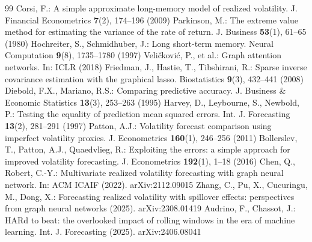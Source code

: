 \documentclass[runningheads]{llncs}
\begin{document}
\begin{thebibliography}{99}
 Corsi, F.: A simple approximate long-memory model of realized volatility. J. Financial Econometrics \textbf{7}(2), 174--196 (2009)
 Parkinson, M.: The extreme value method for estimating the variance of the rate of return. J. Business \textbf{53}(1), 61--65 (1980)
 Hochreiter, S., Schmidhuber, J.: Long short-term memory. Neural Computation \textbf{9}(8), 1735--1780 (1997)
 Veli\v{c}kovi\'c, P., et al.: Graph attention networks. In: ICLR (2018)
 Friedman, J., Hastie, T., Tibshirani, R.: Sparse inverse covariance estimation with the graphical lasso. Biostatistics \textbf{9}(3), 432--441 (2008)
 Diebold, F.X., Mariano, R.S.: Comparing predictive accuracy. J. Business \& Economic Statistics \textbf{13}(3), 253--263 (1995)
 Harvey, D., Leybourne, S., Newbold, P.: Testing the equality of prediction mean squared errors. Int. J. Forecasting \textbf{13}(2), 281--291 (1997)
 Patton, A.J.: Volatility forecast comparison using imperfect volatility proxies. J. Econometrics \textbf{160}(1), 246--256 (2011)
 Bollerslev, T., Patton, A.J., Quaedvlieg, R.: Exploiting the errors: a simple approach for improved volatility forecasting. J. Econometrics \textbf{192}(1), 1--18 (2016)
 Chen, Q., Robert, C.-Y.: Multivariate realized volatility forecasting with graph neural network. In: ACM ICAIF (2022). arXiv:2112.09015
 Zhang, C., Pu, X., Cucuringu, M., Dong, X.: Forecasting realized volatility with spillover effects: perspectives from graph neural networks (2025). arXiv:2308.01419
 Audrino, F., Chassot, J.: HARd to beat: the overlooked impact of rolling windows in the era of machine learning. Int. J. Forecasting (2025). arXiv:2406.08041
\end{thebibliography}
\end{document}

